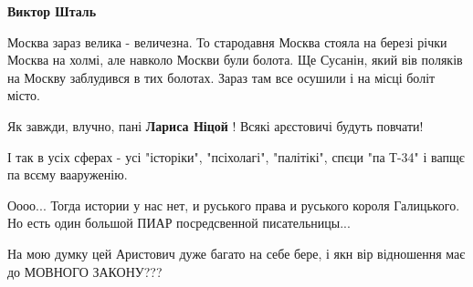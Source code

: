 \begin{itemize}
\begin{itemize}
\begin{itemize}
 
\textbf{Виктор Шталь} 

Москва зараз велика - величезна. То стародавня Москва стояла на березі річки
Москва на холмі, але навколо Москви були болота. Ще Сусанін, який вів поляків
на Москву заблудився в тих болотах. Зараз там все осушили і на місці боліт
місто.
\end{itemize}

\end{itemize}

 
Як завжди, влучно, пані \textbf{Лариса Ніцой} !
Всякі арєстовичі будуть повчати!

 

І так в усіх сферах - усі "історіки", "псіхолагі", "палітікі", спєци "па Т-34"
і вапщє па всєму вааруженію.


 

Оооо... Тогда истории у нас нет, и руського права и руського короля Галицького.
Но есть один большой ПИАР посредсвенной писательницы...

 

На мою думку цей Аристович дуже багато на себе бере, і якн вір відношення має
до МОВНОГО ЗАКОНУ???


\end{itemize}
